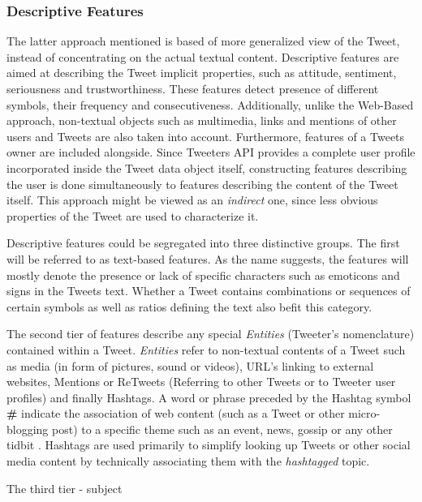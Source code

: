 		
		\subsubsection{Descriptive Features}
		The latter approach mentioned is based of more generalized view of the Tweet, instead of concentrating on the actual textual content. Descriptive features are aimed at describing the Tweet implicit properties, such as attitude, sentiment, seriousness and trustworthiness. These features detect presence of different symbols, their frequency and consecutiveness. Additionally, unlike the Web-Based approach, non-textual objects such as multimedia, links and mentions of other users and Tweets are also taken into account. Furthermore, features of a Tweets owner are included alongside. Since Tweeters API provides a complete user profile incorporated inside the Tweet data object itself, constructing features describing the user is done simultaneously to features describing the content of the Tweet itself. This approach might be viewed as an \textit{indirect} one, since less obvious properties of the Tweet are used to characterize it.
		\par
		Descriptive features could be segregated into three distinctive groups. The first will be referred to as text-based features. As the name suggests, the features will mostly denote the presence or lack of specific characters such as emoticons and signs in the Tweets text. Whether a Tweet contains combinations or sequences of certain symbols as well as ratios defining the text also befit this category.
		\par
		The second tier of features describe any special \textit{Entities} (Tweeter's nomenclature) contained within a Tweet. \textit{Entities} refer to non-textual contents of a Tweet such as media (in form of pictures, sound or videos), URL's linking to external websites, Mentions or ReTweets (Referring to other Tweets or to Tweeter user profiles) and finally Hashtags. A word or phrase preceded by the Hashtag symbol \textbf{\#} indicate the association of web content (such as a Tweet or other micro-blogging post) to a specific theme such as an event, news, gossip or any other tidbit \cite{dict_Tweet}. Hashtags are used primarily to simplify looking up Tweets or other social media content by technically associating them with the \textit{hashtagged} topic.
		\par
		{\color{red}The third tier - subject}
		
		
